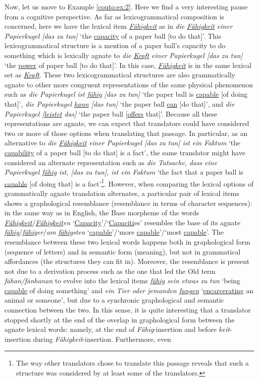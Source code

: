 \documentclass[output=paper]{LSP/langsci}
\begin{document}
Now, let us move to Example \ref{couto:ex:2}. Here we find a very interesting pause from a cognitive perspective. As far as lexicogrammatical composition is concerned, here we have the lexical item \emph{\uline{Fähigkeit}} as in \emph{die \uline{Fähigkeit} einer Papierkugel {[}das zu tun{]}} `the \uline{capacity} of a paper ball {[}to do that{]}'. This lexicogrammatical structure is a mention of a paper ball's capacity to do something which is lexically agnate to \emph{die \uline{Kraft} einer Papierkugel {[}das zu tun{]}} `the \uline{power} of paper ball {[}to do that{]}'. In this case, \emph{\uline{Fähigkeit}} is in the same lexical set as \emph{\uline{Kraft}}. These two lexicogrammatical structures are also grammatically agnate to other more congruent representations of the same physical phenomenon such as \emph{die Papierkugel ist \uline{fähig} {[}das zu tun{]}} `the paper ball is \uline{capable} {[}of doing that{]}', \emph{die Papierkugel \uline{kann} {[}das tun{]}} `the paper ball \uline{can} {[}do that{]}', and \emph{die Papierkugel {[}\uline{leistet} das{]}} `the paper ball {[}\uline{offers} that{]}'. Because all these representations are agnate, we can expect that translators could have considered two or more of those options when translating that passage. In particular, as an alternative to \emph{die \uline{Fähigkeit} einer Papierkugel {[}das zu tun{]} ist ein Faktum} `the \uline{capability} of a paper ball {[}to do that{]} is a fact', the same translator might have considered an alternate representation such as \emph{die Tatsache, dass eine Papierkugel \uline{fähig} ist, {[}das zu tun{]}, ist ein Faktum} `the fact that a paper ball is \uline{capable} {[}of doing that{]} is a fact'\footnote{The way other translators chose to translate this passage reveals that such a structure was considered by at least some of the translators.}. However, when comparing the lexical options of grammatically agnate translation alternates, a particular pair of lexical items shows a graphological resemblance (resemblance in terms of character sequences): in the same way as in English, the Base morpheme of the words \emph{\uline{Fähigkeit}}/\emph{\uline{Fähigkeit}en} `\uline{Capacity}'/`\uline{Capaciti}es' resembles the base of its agnate \emph{\uline{fähig}}/\emph{\uline{fähig}er}/\emph{am \uline{fähig}sten} `\uline{capable}'/`more \uline{capable}'/`most \uline{capable}'. The resemblance between these two lexical words happens both in graphological form (sequence of letters) and in semantic form (meaning), but not in grammatical affordances (the structures they can fit in). Moreover, the resemblance is present not due to a derivation process such as the one that led the Old  term \emph{f\={a}han/f\={a}nhanan} to evolve into the lexical items \emph{\uline{fähig} sein etwas zu tun} `being \uline{capable} of doing something' and \emph{ein Tier oder jemanden \uline{fangen}} `\uline{encarcerating} an animal or someone', but due to a synchronic graphological and semantic connection between the two. In this sense, it is quite interesting that a translator stopped shortly at the end of the overlap in graphological form between the agnate lexical words: namely, at the end of \emph{Fähig}-insertion and before \emph{keit}-insertion during \emph{Fähigkeit}-insertion. Furthermore, even 
\end{document}
